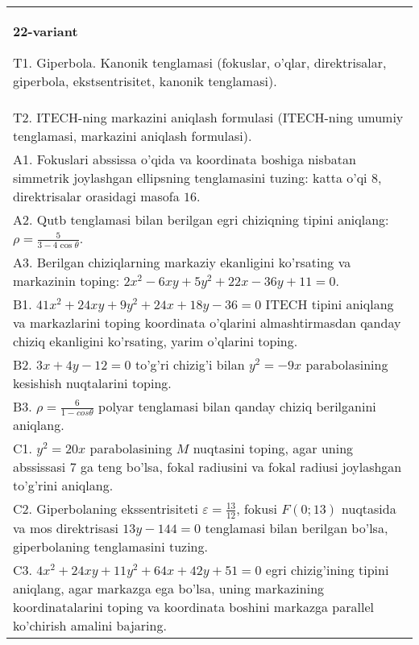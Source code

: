 \documentclass{article}
\begin{document}
\begin{tabular}{m{17cm}}
\textbf{22-variant}
\newline

T1. Giperbola. Kanonik tenglamasi (fokuslar, o'qlar, direktrisalar, giperbola, ekstsentrisitet, kanonik tenglamasi).\\

T2. ITECH-ning markazini aniqlash formulasi (ITECH-ning umumiy tenglamasi, markazini aniqlash formulasi).\\

A1. Fokuslari abssissa o'qida va koordinata boshiga nisbatan simmetrik joylashgan ellipsning tenglamasini tuzing: katta o'qi $8$, direktrisalar orasidagi masofa $16$.\\

A2. Qutb tenglamasi bilan berilgan egri chiziqning tipini aniqlang: $\rho=\frac{5}{3-4\cos\theta}$.\\

A3. Berilgan chiziqlarning markaziy ekanligini ko'rsating va markazinin toping: $2x^{2}-6xy+5y^{2}+22x-36y+11=0$.\\

B1. $41x^{2} + 24xy + 9y^{2} + 24x + 18y - 36 = 0$ ITECH tipini aniqlang va markazlarini toping koordinata o'qlarini almashtirmasdan qanday chiziq ekanligini ko'rsating, yarim o'qlarini toping.  \\

B2. $3x + 4y - 12 = 0$ to'g'ri chizig'i bilan $y^{2} = - 9x$ parabolasining kesishish nuqtalarini toping.  \\

B3. $\rho = \frac{6}{1 - cos\theta}$ polyar tenglamasi bilan qanday chiziq berilganini aniqlang.  \\

C1. $y^{2} = 20x$ parabolasining $M$ nuqtasini toping, agar uning abssissasi 7 ga teng bo'lsa, fokal radiusini va fokal radiusi joylashgan to'g'rini aniqlang.\\

C2. Giperbolaning ekssentrisiteti $\varepsilon = \frac{13}{12}$, fokusi $F(0;13)$ nuqtasida va mos direktrisasi $13y - 144 = 0$ tenglamasi bilan berilgan bo'lsa, giperbolaning tenglamasini tuzing.  \\

C3. $4x^{2} + 24xy + 11y^{2} + 64x + 42y + 51 = 0$ egri chizig'ining tipini aniqlang, agar markazga ega bo'lsa, uning markazining koordinatalarini toping va koordinata boshini markazga parallel ko'chirish amalini bajaring.\\

\end{tabular}
\vspace{1cm}
\end{document}
